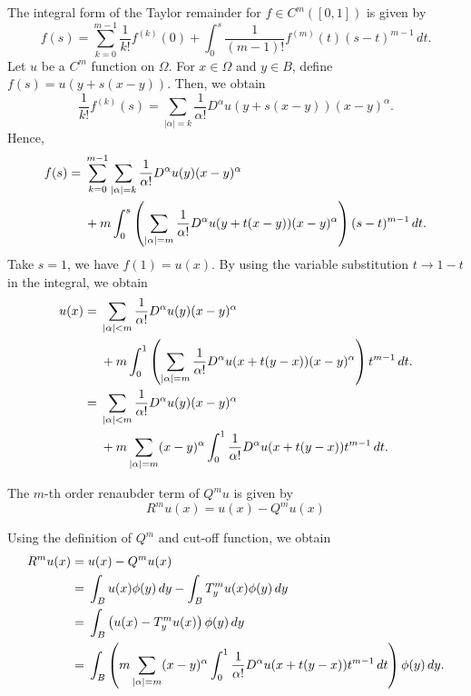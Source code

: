 \documentclass{article}
\begin{document}
The integral form of the Taylor remainder for $f \in C^m([0,1])$ is given by
\begin{equation}
    f(s) = \sum_{k=0}^{m-1}\frac{1}{k!} f^{(k)}(0) + \int_0^s \frac{1}{(m-1)!} f^{(m)}(t)(s-t)^{m-1}\,dt.
\end{equation}
Let $u$ be a $C^m$ function on $\Omega$. For $x \in \Omega$ and $y \in B$, define $f(s) = u(y + s(x-y))$.
Then, we obtain
\begin{equation}
    \frac{1}{k!} f^{(k)}(s) = \sum_{|\alpha| = k}\frac{1}{\alpha !} D^\alpha u(y + s(x-y)) (x-y)^{\alpha}.
\end{equation}
Hence,
\begin{align}
    f(s) ={} & \sum_{k=0}^{m-1} \sum_{|\alpha| = k}\frac{1}{\alpha !} D^\alpha u(y) (x-y)^{\alpha} \notag                             \\
             & + m \int_0^s \left(\sum_{|\alpha| = m}\frac{1}{\alpha !} D^\alpha u(y + t(x-y)) (x-y)^{\alpha} \right)(s-t)^{m-1}\,dt.
\end{align}
Take $s=1$, we have $f(1) = u(x)$. By using the variable substitution $t \to 1-t$ in the integral, we obtain
\begin{align}
    u(x) ={} & \sum_{|\alpha| < m}\frac{1}{\alpha !} D^\alpha u(y) (x-y)^{\alpha}  \notag                                         \\
             & + m \int_0^1 \left(\sum_{|\alpha| = m}\frac{1}{\alpha !} D^\alpha u(x + t(y-x)) (x-y)^{\alpha} \right)t^{m-1}\,dt.
    \\
    ={}      & \sum_{|\alpha| < m}\frac{1}{\alpha !} D^\alpha u(y) (x-y)^{\alpha} \notag                                          \\
             & + m \sum_{|\alpha| = m} (x-y)^{\alpha}\int_0^1 \frac{1}{\alpha !} D^\alpha u(x + t(y-x)) t^{m-1}\,dt.
\end{align}

\begin{definition}
    The $m$-th order renaubder term of $Q^m u$ is given by
    \[
        R^m u(x) = u(x) - Q^m u(x)
    \]
\end{definition}

Using the definition of $Q^m$ and cut-off function, we obtain
\begin{align}
    R^m u(x) ={} & u(x) - Q^m u(x) \notag                                                                                                              \\
    ={}          & \int_B u(x) \phi(y)\,dy - \int_B T_y^m u(x) \phi(y)\,dy \notag                                                                      \\
    ={}          & \int_B \left(u(x) - T_y^m u(x)\right) \phi(y)\,dy \notag                                                                            \\
    ={}          & \int_B \left(m \sum_{|\alpha| = m} (x-y)^{\alpha}\int_0^1 \frac{1}{\alpha !} D^\alpha u(x + t(y-x)) t^{m-1}\,dt\right) \phi(y)\,dy.
\end{align}
\end{document}

